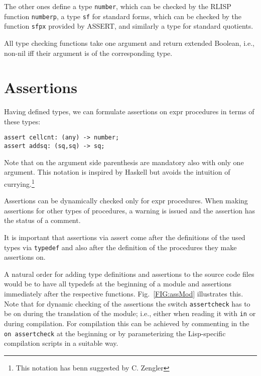 \documentclass{article}
\begin{document}
The other ones define a type \texttt{number}, which can be checked by
the RLISP function \texttt{numberp}, a type \texttt{sf} for standard
forms, which can be checked by the function \texttt{sfpx} provided by
ASSERT, and similarly a type for standard quotients.

All type checking functions take one argument and return extended
Boolean, i.e., non-nil iff their argument is of the corresponding type.

\section{Assertions}
Having defined types, we can formulate assertions on expr procedures in
terms of these types:
\begin{verbatim}
assert cellcnt: (any) -> number;
assert addsq: (sq,sq) -> sq;
\end{verbatim}
Note that on the argument side parenthesis are mandatory also with only
one argument. This notation is inspired by Haskell but avoids the
intuition of currying.\footnote{This notation has benn suggested by C. Zengler}

Assertions can be dynamically checked only for expr procedures. When
making assertions for other types of procedures, a warning is issued and
the assertion has the status of a comment.

It is important that assertions via assert come after the definitions of
the used types via \texttt{typedef} and also after the definition of the
procedures they make assertions on.

A natural order for adding type definitions and assertions to the source
code files would be to have all typedefs at the beginning of a module
and assertions immediately after the respective functions.
Fig.~\ref{FIG:assMod} illustrates this. Note that for dynamic checking
of the assertions the switch \texttt{assertcheck} has to be on during
the translation of the module; i.e., either when reading it with
\texttt{in} or during compilation. For compilation this can be achieved
by commenting in the \texttt{on assertcheck} at the beginning or by
parameterizing the Lisp-specific compilation scripts in a suitable way.
\end{document}
